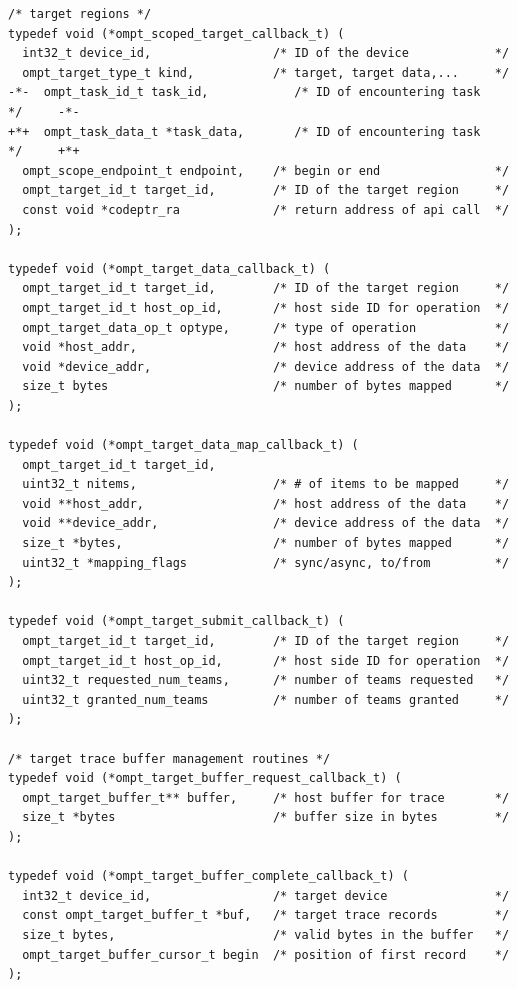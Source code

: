 \documentclass{article}
\begin{document}
\begin{lstlisting}
/* target regions */
typedef void (*ompt_scoped_target_callback_t) ( 
  int32_t device_id,                 /* ID of the device            */
  ompt_target_type_t kind,           /* target, target data,...     */
-*-  ompt_task_id_t task_id,            /* ID of encountering task     */     -*-
+*+  ompt_task_data_t *task_data,       /* ID of encountering task     */     +*+
  ompt_scope_endpoint_t endpoint,    /* begin or end                */ 
  ompt_target_id_t target_id,        /* ID of the target region     */
  const void *codeptr_ra             /* return address of api call  */
);

typedef void (*ompt_target_data_callback_t) (
  ompt_target_id_t target_id,        /* ID of the target region     */
  ompt_target_id_t host_op_id,       /* host side ID for operation  */
  ompt_target_data_op_t optype,      /* type of operation           */
  void *host_addr,                   /* host address of the data    */
  void *device_addr,                 /* device address of the data  */ 
  size_t bytes                       /* number of bytes mapped      */
);

typedef void (*ompt_target_data_map_callback_t) (
  ompt_target_id_t target_id, 
  uint32_t nitems,                   /* # of items to be mapped     */
  void **host_addr,                  /* host address of the data    */
  void **device_addr,                /* device address of the data  */ 
  size_t *bytes,                     /* number of bytes mapped      */
  uint32_t *mapping_flags            /* sync/async, to/from         */
);

typedef void (*ompt_target_submit_callback_t) (
  ompt_target_id_t target_id,        /* ID of the target region     */
  ompt_target_id_t host_op_id,       /* host side ID for operation  */
  uint32_t requested_num_teams,      /* number of teams requested   */
  uint32_t granted_num_teams         /* number of teams granted     */
);

/* target trace buffer management routines */
typedef void (*ompt_target_buffer_request_callback_t) (
  ompt_target_buffer_t** buffer,     /* host buffer for trace       */
  size_t *bytes                      /* buffer size in bytes        */
);

typedef void (*ompt_target_buffer_complete_callback_t) (
  int32_t device_id,                 /* target device               */
  const ompt_target_buffer_t *buf,   /* target trace records        */
  size_t bytes,                      /* valid bytes in the buffer   */
  ompt_target_buffer_cursor_t begin  /* position of first record    */
);


\end{lstlisting}
\end{document}

